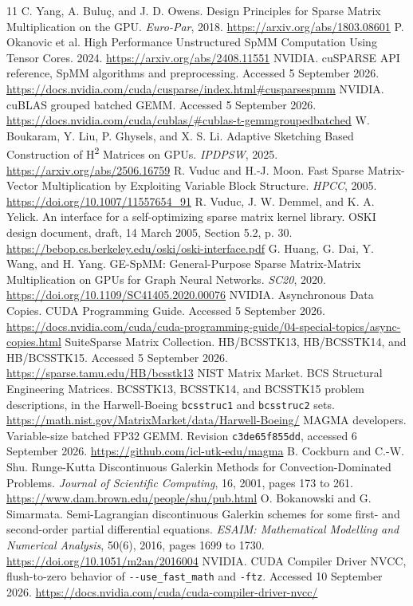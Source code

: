 \documentclass[10pt]{article}
\begin{document}
{\footnotesize
\setlength{\parskip}{0pt}
\begin{thebibliography}{11}
\setlength{\itemsep}{0pt}
\setlength{\parsep}{0pt}
 C. Yang, A. Bulu\c{c}, and J. D. Owens.
Design Principles for Sparse Matrix Multiplication on the GPU.
\emph{Euro-Par}, 2018. \url{https://arxiv.org/abs/1803.08601}
 P. Okanovic et al. High Performance Unstructured SpMM Computation Using
Tensor Cores. 2024. \url{https://arxiv.org/abs/2408.11551}
 NVIDIA. cuSPARSE API reference, SpMM algorithms and
preprocessing. Accessed 5 September 2026.
\url{https://docs.nvidia.com/cuda/cusparse/index.html#cusparsespmm}
 NVIDIA. cuBLAS grouped batched GEMM. Accessed 5 September 2026.
\url{https://docs.nvidia.com/cuda/cublas/#cublas-t-gemmgroupedbatched}
 W. Boukaram, Y. Liu, P. Ghysels, and X. S. Li.
Adaptive Sketching Based Construction of H\textsuperscript{2} Matrices on GPUs.
\emph{IPDPSW}, 2025. \url{https://arxiv.org/abs/2506.16759}
 R. Vuduc and H.-J. Moon. Fast Sparse Matrix-Vector Multiplication
by Exploiting Variable Block Structure. \emph{HPCC}, 2005.
\url{https://doi.org/10.1007/11557654_91}
 R. Vuduc, J. W. Demmel, and K. A. Yelick.
An interface for a self-optimizing sparse matrix kernel library.
OSKI design document, draft, 14 March 2005, Section 5.2, p. 30.
\url{https://bebop.cs.berkeley.edu/oski/oski-interface.pdf}
 G. Huang, G. Dai, Y. Wang, and H. Yang. GE-SpMM: General-Purpose
Sparse Matrix-Matrix Multiplication on GPUs for Graph Neural Networks.
\emph{SC20}, 2020. \url{https://doi.org/10.1109/SC41405.2020.00076}
 NVIDIA. Asynchronous Data Copies. CUDA Programming Guide.
Accessed 5 September 2026.
\url{https://docs.nvidia.com/cuda/cuda-programming-guide/04-special-topics/async-copies.html}
 SuiteSparse Matrix Collection. HB/BCSSTK13, HB/BCSSTK14,
and HB/BCSSTK15. Accessed 5 September 2026.
\url{https://sparse.tamu.edu/HB/bcsstk13}
 NIST Matrix Market. BCS Structural Engineering Matrices.
BCSSTK13, BCSSTK14, and BCSSTK15 problem descriptions, in the Harwell-Boeing
\texttt{bcsstruc1} and \texttt{bcsstruc2} sets.
\url{https://math.nist.gov/MatrixMarket/data/Harwell-Boeing/}
 MAGMA developers. Variable-size batched FP32 GEMM.
Revision \texttt{c3de65f855dd}, accessed 6 September 2026.
\url{https://github.com/icl-utk-edu/magma}
 B. Cockburn and C.-W. Shu. Runge-Kutta Discontinuous Galerkin
Methods for Convection-Dominated Problems. \emph{Journal of Scientific
Computing}, 16, 2001, pages 173 to 261.
\url{https://www.dam.brown.edu/people/shu/pub.html}
 O. Bokanowski and G. Simarmata. Semi-Lagrangian discontinuous
Galerkin schemes for some first- and second-order partial differential equations.
\emph{ESAIM: Mathematical Modelling and Numerical Analysis}, 50(6), 2016,
pages 1699 to 1730. \url{https://doi.org/10.1051/m2an/2016004}
 NVIDIA. CUDA Compiler Driver NVCC, flush-to-zero behavior of
\texttt{-{}-use\_fast\_math} and \texttt{-ftz}. Accessed 10 September 2026.
\url{https://docs.nvidia.com/cuda/cuda-compiler-driver-nvcc/}
\end{thebibliography}
}
\end{document}
